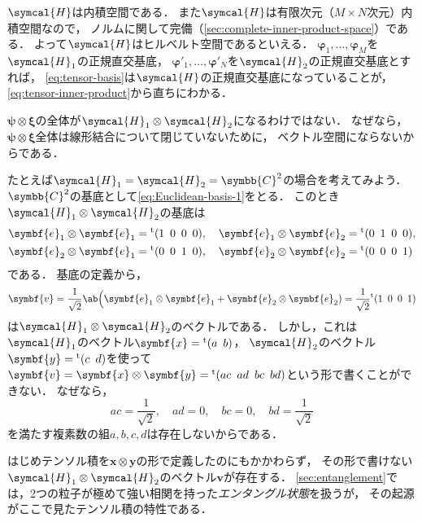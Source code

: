 \documentclass[
]{sotsu}
\newcommand{\bpsi}{\symbf{\psi}}
\newcommand{\bphi}{\symbf{\varphi}}
\newcommand{\bxi}{\symbf{\xi}}
\begin{document}
$\symcal{H}$は内積空間である．
また$\symcal{H}$は有限次元（$M \times N$次元）内積空間なので，
ノルムに関して完備（\cref{sec:complete-inner-product-space}）である．
よって$\symcal{H}$はヒルベルト空間であるといえる．
$\bphi_1, \dots, \bphi_M$を$\symcal{H}_1$の正規直交基底，
$\bphi'_1, \dots, \bphi'_N$を$\symcal{H}_2$の正規直交基底とすれば，
\cref{eq:tensor-basis}は$\symcal{H}$の正規直交基底になっていることが，
\cref{eq:tensor-inner-product}から直ちにわかる．


\bluehead{$\bpsi \otimes \bxi$と書けないテンソル積}\quad 
$\bpsi \otimes \bxi$の全体が$\symcal{H}_1 \otimes \symcal{H}_2$になるわけではない．
なぜなら，
$\bpsi \otimes \bxi$全体は線形結合について閉じていないために，
ベクトル空間にならないからである．

たとえば$\symcal{H}_1 = \symcal{H}_2 = \symbb{C}^2$の場合を考えてみよう．
$\symbb{C}^2$の基底として\cref{eq:Euclidean-basis-1}をとる．
このとき$\symcal{H}_1 \otimes \symcal{H}_2$の基底は
\begin{equation*}
    \begin{split}
        \symbf{e}_1 \otimes \symbf{e}_1 &= \cvector{1 ; 0 ; 0 ; 0},
        \quad 
        \symbf{e}_1 \otimes \symbf{e}_2 = \cvector{0 ; 1 ; 0 ; 0},
        \\
        \symbf{e}_2 \otimes \symbf{e}_1 &= \cvector{0 ; 0 ; 1 ; 0},
        \quad 
        \symbf{e}_2 \otimes \symbf{e}_2 = \cvector{0 ; 0 ; 0 ; 1}
    \end{split}
\end{equation*}
である．
基底の定義から，
\begin{equation*}
    \symbf{v}
    = \frac{1}{\sqrt{2}} \ab\Big( \symbf{e}_1 \otimes \symbf{e}_1 + \symbf{e}_2 \otimes \symbf{e}_2 )
    = \frac{1}{\sqrt{2}} \cvector{1 ; 0 ; 0 ; 1}
\end{equation*}
は$\symcal{H}_1 \otimes \symcal{H}_2$のベクトルである．
しかし，これは$\symcal{H}_1$のベクトル$\symbf{x} = \cvector{a ; b}$，
$\symcal{H}_2$のベクトル$\symbf{y} = \cvector{c ; d}$を使って$\symbf{v} = \symbf{x} \otimes \symbf{y} = \cvector{ac ; ad ; bc ; bd}$という形で書くことができない．
なぜなら，
\begin{equation*}
    ac = \frac{1}{\sqrt{2}}, \quad 
    ad = 0, \quad 
    bc = 0, \quad 
    bd = \frac{1}{\sqrt{2}}
\end{equation*}
を満たす複素数の組$a, b, c, d$は存在しないからである．

はじめテンソル積を$\symbf{x} \otimes \symbf{y}$の形で定義したのにもかかわらず，
その形で書けない$\symcal{H}_1 \otimes \symcal{H}_2$のベクトル$\symbf{v}$が存在する．
\cref{sec:entanglement}では，2つの粒子が極めて強い相関を持った\emph{エンタングル状態}を扱うが，
その起源がここで見たテンソル積の特性である．
\end{document}
